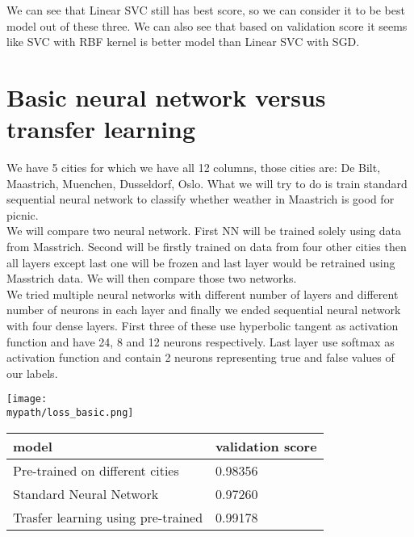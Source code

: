 \documentclass[a4paper]{article}
\begin{document}
	We can see that Linear SVC still has best score, so we can consider it to be best model out of these three. We can also see that based on validation score it seems like SVC with RBF kernel is better model than Linear SVC with SGD. 
	
	\newpage

	\section{Basic neural network versus transfer learning}
	
	We have 5 cities for which we have all 12 columns, those cities are: De Bilt, Maastrich, Muenchen, Dusseldorf, Oslo. What we will try to do is train standard sequential neural network to classify whether weather in Maastrich is good for picnic. 
	\\
	
	We will compare two neural network. First NN will be trained solely using data from Masstrich. Second will be firstly trained on data from four other cities then all layers except last one will be frozen and last layer would be retrained using Masstrich data. We will then compare those two networks.  
	\\
	
	We tried multiple neural networks with different number of layers and different number of neurons in each layer and finally we ended sequential neural network with four dense layers. First three of these use hyperbolic tangent as activation function and have 24, 8 and 12 neurons respectively. Last layer use softmax as activation function and contain 2 neurons representing true and false values of our labels.    
	
	\centerline{\texttt{[image: \\mypath/loss\_basic.png]}}
	
	\begin{table}[!h]
		\begin{tabular}{|l|l|}
			\hline
			model &  validation score  \\ \hline
			Pre-trained on different cities  & 0.98356 \\ \hline
			Standard Neural Network & 0.97260 \\ \hline
			Trasfer learning using pre-trained &  0.99178 \\ \hline
		\end{tabular}
	\end{table} 
\end{document}
